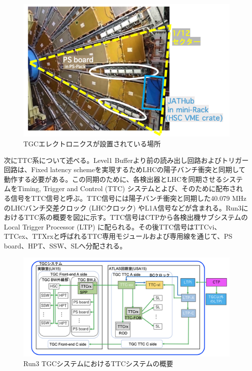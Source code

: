 \begin{figure} 
    \centering
    \includegraphics[width=16cm]{fig/Intro/TGC_elec_mount.png}
    \caption[TGCエレクトロニクスが設置されている場所]{TGCエレクトロニクスが設置されている場所}
    \label{TGC_elec_mount}
\end{figure}

次にTTC系について述べる。Level1 Bufferより前の読み出し回路およびトリガー回路は、Fixed latency schemeを実現するためLHCの陽子バンチ衝突と同期して動作する必要がある。この同期のために、各検出器とLHCを同期させるシステムをTiming, Trigger and Control  (TTC) システムとよび、そのために配布される信号をTTC信号と呼ぶ。TTC信号には陽子バンチ衝突と同期した40.079 MHzのLHCバンチ交差クロック  (LHCクロック) やL1A信号などが含まれる。Run3におけるTTC系の概要を図\ref{Run3_TTC}に示す。TTC信号はCTPから各検出機サブシステムのLocal Trigger Processor  (LTP) に配られる。その後TTC信号はTTCvi、TTCex、TTXrxと呼ばれるTTC専用モジュールおよび専用線を通じて、PS board、HPT、SSW、SLへ分配される。

\begin{figure} 
\centering
\includegraphics[width=16cm]{fig/Intro/Run3_TTC.png}
\caption[Run3 TGCシステムにおけるTTCシステムの概要]{Run3 TGCシステムにおけるTTCシステムの概要\cite{JINST:2008}}
\label{Run3_TTC}
\end{figure}

